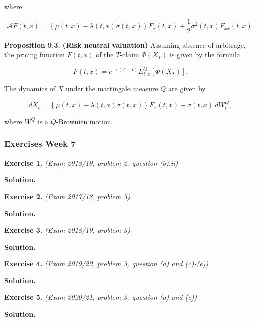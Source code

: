 \documentclass[
]{article}
\begin{document}
where

\[
\mathcal{A}F(t,x)=\left\{\mu(t,x)-\lambda(t,x)\sigma(t,x)\right\}F_x(t,x)+\frac{1}{2}\sigma^2(t,x)F_{xx}(t,x).
\]

\textbf{Proposition 9.3.} \textbf{(Risk neutral valuation)} Assuming
absence of arbitrage, the pricing function \(F(t,x)\) of the \(T\)-claim
\(\Phi(X_T)\) is given by the formula

\[
F(t,x)=e^{-r(T-t)}E^Q_{t,x}[\Phi(X_T)].
\]

The dynamics of \(X\) under the martingale measure \(Q\) are given by

\[
dX_t=\left\{\mu(t,x)-\lambda(t,x)\sigma(t,x)\right\}F_x(t,x)+\sigma(t,x)\ dW^Q_t,
\]

where \(W^Q\) is a \(Q\)-Brownien motion.

\hypertarget{exercises-week-7}{%
\subsubsection{Exercises Week 7}\label{exercises-week-7}}

\textbf{Exercise 1.} \emph{(Exam 2018/19, problem 2, question (b).ii)}

\textbf{Solution.}

\textbf{Exercise 2.} \emph{(Exam 2017/18, problem 3)}

\textbf{Solution.}

\textbf{Exercise 3.} \emph{(Exam 2018/19, problem 3)}

\textbf{Solution.}

\textbf{Exercise 4.} \emph{(Exam 2019/20, problem 3, question (a) and
(c)-(e))}

\textbf{Solution.}

\textbf{Exercise 5.} \emph{(Exam 2020/21, problem 3, question (a) and
(c))}

\textbf{Solution.}
\end{document}
